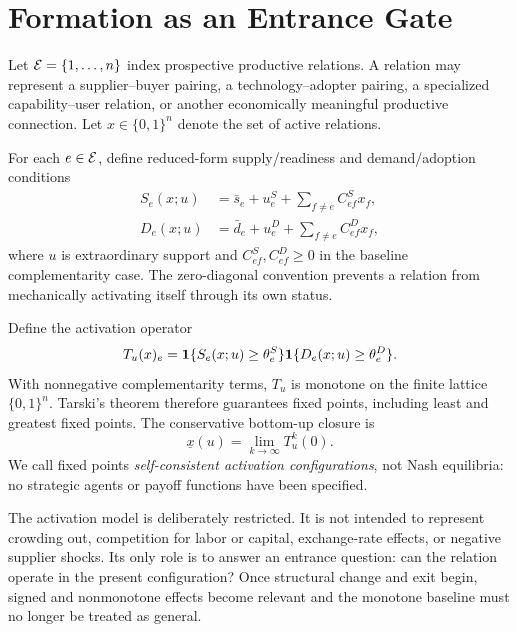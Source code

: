 \section{Formation as an Entrance Gate}
\label{sec:formation}

Let $\mathcal{E}=\{1,\ldots,n\}$ index prospective productive relations. A relation may represent a supplier--buyer pairing, a technology--adopter pairing, a specialized capability--user relation, or another economically meaningful productive connection. Let $x\in\{0,1\}^n$ denote the set of active relations.

For each $e\in\mathcal{E}$, define reduced-form supply/readiness and demand/adoption conditions
\begin{align}
S_e(x;u)
&=
\bar s_e+u_e^S+\sum_{f\neq e}C^S_{ef}x_f,
\\
D_e(x;u)
&=
\bar d_e+u_e^D+\sum_{f\neq e}C^D_{ef}x_f,
\end{align}
where $u$ is extraordinary support and $C^S_{ef},C^D_{ef}\ge0$ in the baseline complementarity case. The zero-diagonal convention prevents a relation from mechanically activating itself through its own status.

Define the activation operator
\begin{equation}
T_u(x)_e
=
\mathbf{1}\{S_e(x;u)\ge\theta_e^S\}
\mathbf{1}\{D_e(x;u)\ge\theta_e^D\}.
\label{eq:activation-operator}
\end{equation}
With nonnegative complementarity terms, $T_u$ is monotone on the finite lattice $\{0,1\}^n$. Tarski's theorem therefore guarantees fixed points, including least and greatest fixed points. The conservative bottom-up closure is
\begin{equation}
\underline x(u)
=
\lim_{k\to\infty}T_u^k(0).
\label{eq:bottom-up}
\end{equation}
We call fixed points \emph{self-consistent activation configurations}, not Nash equilibria: no strategic agents or payoff functions have been specified.

The activation model is deliberately restricted. It is not intended to represent crowding out, competition for labor or capital, exchange-rate effects, or negative supplier shocks. Its only role is to answer an entrance question: can the relation operate in the present configuration? Once structural change and exit begin, signed and nonmonotone effects become relevant and the monotone baseline must no longer be treated as general.
